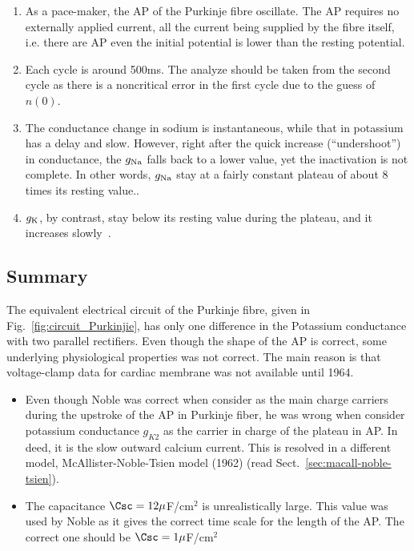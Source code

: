 \begin{enumerate}
\item As a pace-maker, the AP of the Purkinje fibre oscillate.  The AP
  requires no externally applied current, all the current being
  supplied by the fibre itself, i.e. there are AP even the initial
  potential is lower than the resting potential.
\item Each cycle is around 500ms. The analyze should be taken from the
  second cycle as there is a noncritical error in the first cycle due
  to the guess of $n(0)$.
\item The conductance change in sodium is instantaneous, while that in
  potassium has a delay and slow. However, right after the quick
  increase (``undershoot'') in conductance, the $g_{\ce{Na}}$ falls back
  to a lower value, yet the inactivation is not complete. In other
  words, $g_{\ce{Na}}$ stay at a fairly constant plateau of about 8
  times its resting value..
\item $g_{\ce{K}}$, by contrast, stay below its resting value during the
  plateau, and it increases slowly~\citep{noble1960cap}.
\end{enumerate}




\subsection{Summary}
\label{sec:summary-4}

The equivalent electrical circuit of the Purkinje fibre, given in
Fig.~\ref{fig:circuit_Purkinjie}, has only one difference in the
Potassium conductance with two parallel rectifiers.  Even though the
shape of the AP is correct, some underlying physiological properties
was not correct. The main reason is that voltage-clamp data for
cardiac membrane was not available until 1964.
\begin{itemize}
\item Even though Noble was correct when consider  as the main
  charge carriers during the upstroke of the AP in Purkinje fiber, he
  was wrong when consider potassium conductance $g_{K2}$ as the
  carrier in charge of the plateau in AP. In deed, it is the slow
  outward calcium current. This is resolved in a different model,
  McAllister-Noble-Tsien model (1962) (read
  Sect.~\ref{sec:macall-noble-tsien}).

\item The capacitance $\Csc=12 \mu$F/cm$^2$ is unrealistically
  large. This value was used by Noble as it gives the correct time
  scale for the length of the AP. The correct one should be
  $\Csc=1\mu$F/cm$^2$
\end{itemize}

